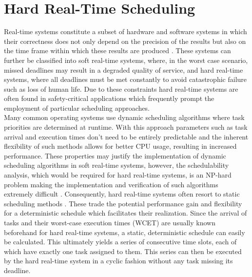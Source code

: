 \section{Hard Real-Time Scheduling}
Real-time systems constitute a subset of hardware and software systems in which their correctness does not only depend on the precision of the results but also on the time frame within which these results are produced \cite{Ahmed2011}. These systems can further be classified into soft real-time systems, where, in the worst case scenario, missed deadlines may result in a degraded quality of service, and hard real-time systems, where all deadlines must be met constantly to avoid catastrophic failure such as loss of human life. Due to these constraints hard real-time systems are often found in safety-critical applications which frequently prompt the employment of particular scheduling approaches.\\
\hspace*{0.5ex}\hspace{0.5ex} Many common operating systems use dynamic scheduling algorithms where task priorities are determined at runtime. With this approach parameters such as task arrival and execution times don't need to be entirely predictable and the inherent flexibility of such methods allows for better CPU usage, resulting in increased performance. These properties may justify the implementation of dynamic scheduling algorithms in soft real-time systems, however, the schedulability analysis, which would be required for hard real-time systems, is an NP-hard problem making the implementation and verification of such algorithms extremely difficult \cite{Baruah}. Consequently, hard real-time systems often resort to static scheduling methods \cite{Cheng1987}. These trade the potential performance gain and flexibility for a deterministic schedule which facilitates their realization. Since the arrival of tasks and their worst-case execution times (WCET) are usually known beforehand for hard real-time systems, a static, deterministic schedule can easily be calculated. This ultimately yields a series of consecutive time slots, each of which have exactly one task assigned to them. This series can then be executed by the hard real-time system in a cyclic fashion without any task missing its deadline.
